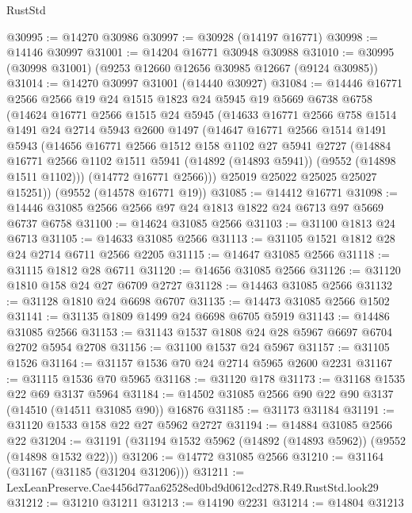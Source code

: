 \begin{lexlean}{RustStd}
\begin{coremodule}
@30995 := @14270 @30986
@30997 := @30928 (@14197 @16771)
@30998 := @14146 @30997
@31001 := @14204 @16771 @30948 @30988
@31010 := @30995 (@30998 @31001) (@9253 @12660 @12656 @30985 @12667 (@9124 @30985))
@31014 := @14270 @30997 @31001 (@14440 @30927)
@31084 := @14446
    @16771
    @2566
    @2566
    @19
    @24
    @1515
    @1823
    @24
    @5945
    @19
    @5669
    @6738
    @6758
    (@14624
      @16771
      @2566
      @1515
      @24
      @5945
      (@14633
        @16771
        @2566
        @758
        @1514
        @1491
        @24
        @2714
        @5943
        @2600
        @1497
        (@14647
          @16771
          @2566
          @1514
          @1491
          @5943
          (@14656
            @16771
            @2566
            @1512
            @158
            @1102
            @27
            @5941
            @2727
            (@14884
              @16771
              @2566
              @1102
              @1511
              @5941
              (@14892 (@14893 @5941))
              (@9552 (@14898 @1511 @1102)))
            (@14772 @16771 @2566)))
        @25019
        @25022
        @25025
        @25027
        @15251))
    (@9552 (@14578 @16771 @19))
@31085 := @14412 @16771
@31098 := @14446 @31085 @2566 @2566 @97 @24 @1813 @1822 @24 @6713 @97 @5669 @6737 @6758
@31100 := @14624 @31085 @2566
@31103 := @31100 @1813 @24 @6713
@31105 := @14633 @31085 @2566
@31113 := @31105 @1521 @1812 @28 @24 @2714 @6711 @2566 @2205
@31115 := @14647 @31085 @2566
@31118 := @31115 @1812 @28 @6711
@31120 := @14656 @31085 @2566
@31126 := @31120 @1810 @158 @24 @27 @6709 @2727
@31128 := @14463 @31085 @2566
@31132 := @31128 @1810 @24 @6698 @6707
@31135 := @14473 @31085 @2566 @1502
@31141 := @31135 @1809 @1499 @24 @6698 @6705 @5919
@31143 := @14486 @31085 @2566
@31153 := @31143 @1537 @1808 @24 @28 @5967 @6697 @6704 @2702 @5954 @2708
@31156 := @31100 @1537 @24 @5967
@31157 := @31105 @1526
@31164 := @31157 @1536 @70 @24 @2714 @5965 @2600 @2231
@31167 := @31115 @1536 @70 @5965
@31168 := @31120 @178
@31173 := @31168 @1535 @22 @69 @3137 @5964
@31184 := @14502 @31085 @2566 @90 @22 @90 @3137 (@14510 (@14511 @31085 @90)) @16876
@31185 := @31173 @31184
@31191 := @31120 @1533 @158 @22 @27 @5962 @2727
@31194 := @14884 @31085 @2566 @22
@31204 := @31191 (@31194 @1532 @5962 (@14892 (@14893 @5962)) (@9552 (@14898 @1532 @22)))
@31206 := @14772 @31085 @2566
@31210 := @31164 (@31167 (@31185 (@31204 @31206)))
@31211 := LexLeanPreserve.Cae4456d77aa62528ed0bd9d0612cd278.R49.RustStd.look29
@31212 := @31210 @31211
@31213 := @14190 @2231
@31214 := @14804 @31213

\end{coremodule}
\end{lexlean}
